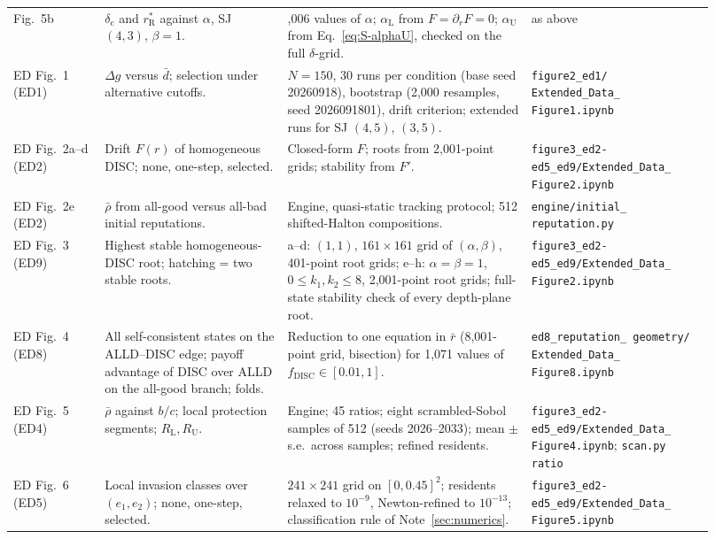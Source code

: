 \documentclass[fleqn,10pt]{article}
\theoremstyle{plain}
\theoremstyle{remark}
\newcommand{\FigOpportunism}{5}
\newcommand{\EDRecognition}{1}
\newcommand{\EDResident}{2}
\newcommand{\EDPlanes}{3}
\newcommand{\EDEdge}{4}
\newcommand{\EDRatio}{5}
\newcommand{\EDErrors}{6}
\newcommand{\DISC}{\mathrm{DISC}}
\newcommand{\rR}{r^*_{\mathrm R}}
\begin{document}
{\begin{longtable}{@{}>{\raggedright\arraybackslash}p{0.12\linewidth}>{\raggedright\arraybackslash}p{0.24\linewidth}>{\raggedright\arraybackslash}p{0.32\linewidth}>{\raggedright\arraybackslash}p{0.24\linewidth}@{}}
Fig.~\FigOpportunism b & $\delta_{\mathrm c}$ and $\rR$ against $\alpha$, SJ $(4,3)$, $\beta=1$. & 1,006 values of $\alpha$; $\alpha_{\mathrm L}$ from $F=\partial_rF=0$; $\alpha_{\mathrm U}$ from Eq.~\eqref{eq:S-alphaU}, checked on the full $\delta$-grid. & as above\\
ED Fig.~\EDRecognition{} (ED1) & $\Delta g$ versus $\bar d$; selection under alternative cutoffs. & $N=150$, 30 runs per condition (base seed 20260918), bootstrap (2,000 resamples, seed 2026091801), drift criterion; extended runs for SJ $(4,5)$, $(3,5)$. & \texttt{figure2\_ed1/ Extended\_Data\_ Figure1.ipynb}\\
ED Fig.~\EDResident a--d (ED2) & Drift $F(r)$ of homogeneous DISC; none, one-step, selected. & Closed-form $F$; roots from 2,001-point grids; stability from $F'$. & \texttt{figure3\_ed2-ed5\_ed9/\allowbreak Extended\_Data\_ Figure2.ipynb}\\
ED Fig.~\EDResident e (ED2) & $\bar\rho$ from all-good versus all-bad initial reputations. & Engine, quasi-static tracking protocol; 512 shifted-Halton compositions. & \texttt{engine/initial\_ reputation.py}\\
ED Fig.~\EDPlanes{} (ED9) & Highest stable homogeneous-DISC root; hatching = two stable roots. & a--d: $(1,1)$, $161\times161$ grid of $(\alpha,\beta)$, 401-point root grids; e--h: $\alpha=\beta=1$, $0\le k_1,k_2\le8$, 2,001-point root grids; full-state stability check of every depth-plane root. & \texttt{figure3\_ed2-ed5\_ed9/\allowbreak Extended\_Data\_ Figure2.ipynb}\\
ED Fig.~\EDEdge{} (ED8) & All self-consistent states on the ALLD--DISC edge; payoff advantage of DISC over ALLD on the all-good branch; folds. & Reduction to one equation in $\bar r$ (8,001-point grid, bisection) for 1,071 values of $f_{\DISC}\in[0.01,1]$. & \texttt{ed8\_reputation\_ geometry/ Extended\_Data\_ Figure8.ipynb}\\
ED Fig.~\EDRatio{} (ED4) & $\bar\rho$ against $b/c$; local protection segments; $R_{\mathrm L},R_{\mathrm U}$. & Engine; 45 ratios; eight scrambled-Sobol samples of 512 (seeds 2026--2033); mean $\pm$ s.e.\ across samples; refined residents. & \texttt{figure3\_ed2-ed5\_ed9/\allowbreak Extended\_Data\_ Figure4.ipynb}; \texttt{scan.py ratio}\\
ED Fig.~\EDErrors{} (ED5) & Local invasion classes over $(e_1,e_2)$; none, one-step, selected. & $241\times241$ grid on $[0,0.45]^2$; residents relaxed to $10^{-9}$, Newton-refined to $10^{-13}$; classification rule of Note~\ref{sec:numerics}. & \texttt{figure3\_ed2-ed5\_ed9/\allowbreak Extended\_Data\_ Figure5.ipynb}\\

\end{longtable}}
\end{document}
